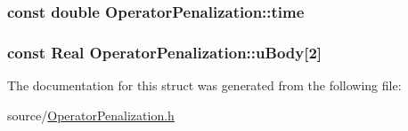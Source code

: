 \subsubsection[{time}]{\setlength{\rightskip}{0pt plus 5cm}const double Operator\+Penalization\+::time}\label{struct_operator_penalization_ae71ef9456d8ef4f2b054da734444581c}
\hypertarget{struct_operator_penalization_a4a7db22b3ff2eba63d29c4484b6fbd0d}{}
\subsubsection[{u\+Body}]{\setlength{\rightskip}{0pt plus 5cm}const {\bf Real} Operator\+Penalization\+::u\+Body\mbox{[}2\mbox{]}}\label{struct_operator_penalization_a4a7db22b3ff2eba63d29c4484b6fbd0d}


The documentation for this struct was generated from the following file\+:\begin{DoxyCompactItemize}
\item 
source/\hyperlink{_operator_penalization_8h}{Operator\+Penalization.\+h}\end{DoxyCompactItemize}
